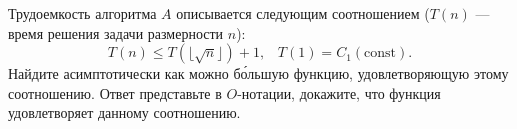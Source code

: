\documentclass{article}
\begin{document}
Трудоемкость алгоритма $A$ описывается следующим соотношением ($T(n)$ --- время решения задачи размерности $n$):
$$T(n) \leqslant T(\lfloor \sqrt{n} \rfloor ) + 1,\;\;\; T(1) = C_1 (\textrm{const}).$$
Найдите асимптотически как можно б\'{о}льшую функцию, удовлетворяющую этому соотношению. Ответ представьте в $O$-нотации, докажите, что функция удовлетворяет данному соотношению.
\end{document}
